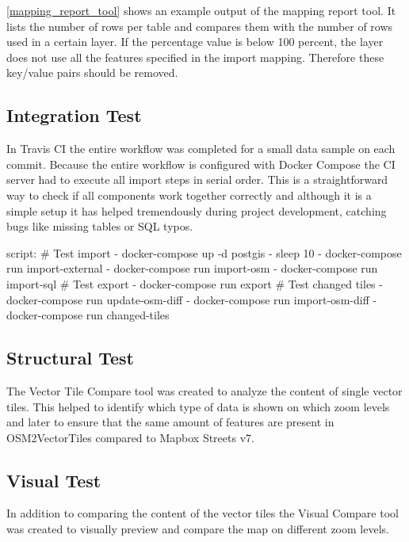 \autoref{mapping_report_tool} shows an example output of the mapping report tool. It lists the number of rows per table and compares them with the number of rows used in a certain layer. If the percentage value is below 100 percent, the layer does not use all the features specified in the import mapping. Therefore these \osm{} key/value pairs should be removed.

\subsection{Integration Test}

In Travis CI\cite{pm_5_travis-ci.org_2015} the entire workflow was completed for a small data sample on each commit.
Because the entire workflow is configured with Docker Compose \cite{pm_6_docs.docker.com_2015} the CI server had to execute all import steps in serial order. This is a straightforward way to check if all components work together correctly
and although it is a simple setup it has helped tremendously during project development, catching bugs
like missing tables or SQL typos.

\begin{yamlcode}
script:
  # Test import
  - docker-compose up -d postgis
  - sleep 10
  - docker-compose run import-external
  - docker-compose run import-osm
  - docker-compose run import-sql
  # Test export
  - docker-compose run export
  # Test changed tiles
  - docker-compose run update-osm-diff
  - docker-compose run import-osm-diff
  - docker-compose run changed-tiles
\end{yamlcode}

\subsection{Structural Test}

The Vector Tile Compare tool was created to analyze the content of single vector tiles. This helped to identify which type of data is shown on which zoom levels and later to ensure that the same amount of features are present in OSM2VectorTiles compared to Mapbox Streets v7.

\subsection{Visual Test}

In addition to comparing the content of the vector tiles the Visual Compare tool was created to visually preview and compare the map on different zoom levels. 

